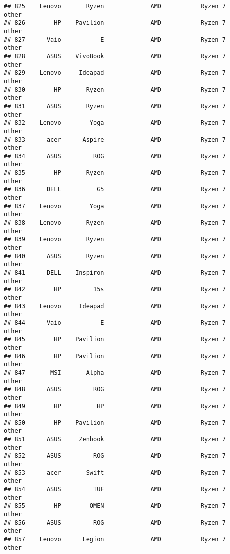 \documentclass[
]{article}
\begin{document}
\begin{verbatim}
## 825    Lenovo       Ryzen             AMD           Ryzen 7           other
## 826        HP    Pavilion             AMD           Ryzen 7           other
## 827      Vaio           E             AMD           Ryzen 7           other
## 828      ASUS    VivoBook             AMD           Ryzen 7           other
## 829    Lenovo     Ideapad             AMD           Ryzen 7           other
## 830        HP       Ryzen             AMD           Ryzen 7           other
## 831      ASUS       Ryzen             AMD           Ryzen 7           other
## 832    Lenovo        Yoga             AMD           Ryzen 7           other
## 833      acer      Aspire             AMD           Ryzen 7           other
## 834      ASUS         ROG             AMD           Ryzen 7           other
## 835        HP       Ryzen             AMD           Ryzen 7           other
## 836      DELL          G5             AMD           Ryzen 7           other
## 837    Lenovo        Yoga             AMD           Ryzen 7           other
## 838    Lenovo       Ryzen             AMD           Ryzen 7           other
## 839    Lenovo       Ryzen             AMD           Ryzen 7           other
## 840      ASUS       Ryzen             AMD           Ryzen 7           other
## 841      DELL    Inspiron             AMD           Ryzen 7           other
## 842        HP         15s             AMD           Ryzen 7           other
## 843    Lenovo     Ideapad             AMD           Ryzen 7           other
## 844      Vaio           E             AMD           Ryzen 7           other
## 845        HP    Pavilion             AMD           Ryzen 7           other
## 846        HP    Pavilion             AMD           Ryzen 7           other
## 847       MSI       Alpha             AMD           Ryzen 7           other
## 848      ASUS         ROG             AMD           Ryzen 7           other
## 849        HP          HP             AMD           Ryzen 7           other
## 850        HP    Pavilion             AMD           Ryzen 7           other
## 851      ASUS     Zenbook             AMD           Ryzen 7           other
## 852      ASUS         ROG             AMD           Ryzen 7           other
## 853      acer       Swift             AMD           Ryzen 7           other
## 854      ASUS         TUF             AMD           Ryzen 7           other
## 855        HP        OMEN             AMD           Ryzen 7           other
## 856      ASUS         ROG             AMD           Ryzen 7           other
## 857    Lenovo      Legion             AMD           Ryzen 7           other

\end{verbatim}
\end{document}
